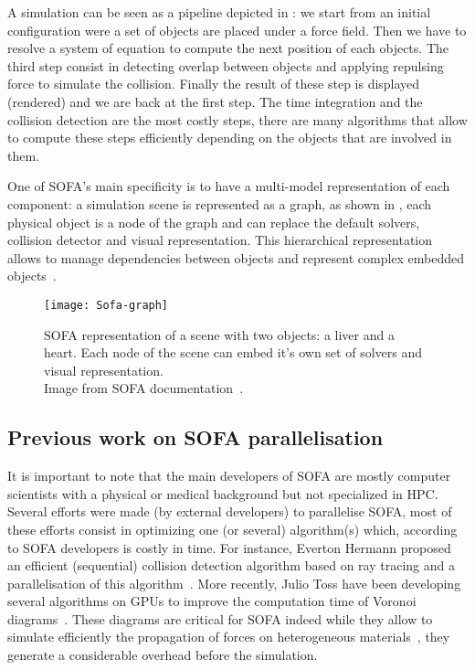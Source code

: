 A simulation can be seen as a pipeline depicted in : we
start from an initial configuration were a set of objects are placed under a
force field. Then we have to resolve a system of equation to compute the next
position of each objects. The third step consist in detecting overlap between
objects and applying repulsing force to simulate the collision.  Finally the
result of these step is displayed (rendered) and we are back at the first
step. The time integration and the collision detection are the most costly
steps, there are many algorithms that allow to compute these steps efficiently
depending on the objects that are involved in them.

One of \gls{SOFA}'s main specificity is to have a multi-model representation
of each component: a simulation scene is represented as a graph, as shown in
, each physical object is a node of the graph and can replace
the default solvers, collision detector and visual representation. This
hierarchical representation allows to manage dependencies between objects and
represent complex embedded objects~\cite{Nesme09Preserving,Faure11Sparse}.

\begin{figure}[htb]
    \centering
    \texttt{[image: Sofa-graph]}
    \caption[Example of SOFA scene graph]{SOFA representation of a scene with two objects: a liver and a
        heart. Each node of the scene can embed it's own set of solvers and
        visual representation.\\
        Image from SOFA documentation~\cite{SOFA16Sofa}.}
    \label{fig:sofa-tree}
\end{figure}


\subsection{Previous work on SOFA parallelisation}

It is important to note that the main developers of \gls{SOFA} are  mostly
computer scientists with a physical or medical background but not specialized in
\gls{HPC}. Several efforts were made (by external developers) to parallelise
\gls{SOFA}, most of these efforts consist in optimizing one (or several)
algorithm(s) which, according to \gls{SOFA} developers is costly in time. For
instance, Everton Hermann proposed an efficient (sequential) collision
detection algorithm based on ray tracing and a parallelisation of this
algorithm~\cite{Hermann08Raytraced}. More recently, Julio Toss have been developing
several algorithms on \glspl{GPU} to improve the computation time of Voronoi
diagrams~\cite{Toss13Parallel,Toss14Parallel}. These diagrams are critical for
\gls{SOFA} indeed while they allow to simulate efficiently the propagation
of forces on heterogeneous materials~\cite{Faure11Sparse}, they generate a
considerable overhead before the simulation.

